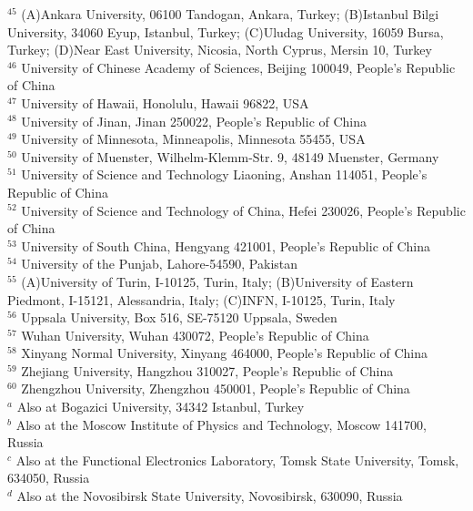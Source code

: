 \begin{small}
\begin{center}
{$^{45}$ (A)Ankara University, 06100 Tandogan, Ankara, Turkey; (B)Istanbul Bilgi University, 34060 Eyup, Istanbul, Turkey; (C)Uludag University, 16059 Bursa, Turkey; (D)Near East University, Nicosia, North Cyprus, Mersin 10, Turkey\\
$^{46}$ University of Chinese Academy of Sciences, Beijing 100049, People's Republic of China\\
$^{47}$ University of Hawaii, Honolulu, Hawaii 96822, USA\\
$^{48}$ University of Jinan, Jinan 250022, People's Republic of China\\
$^{49}$ University of Minnesota, Minneapolis, Minnesota 55455, USA\\
$^{50}$ University of Muenster, Wilhelm-Klemm-Str. 9, 48149 Muenster, Germany\\
$^{51}$ University of Science and Technology Liaoning, Anshan 114051, People's Republic of China\\
$^{52}$ University of Science and Technology of China, Hefei 230026, People's Republic of China\\
$^{53}$ University of South China, Hengyang 421001, People's Republic of China\\
$^{54}$ University of the Punjab, Lahore-54590, Pakistan\\
$^{55}$ (A)University of Turin, I-10125, Turin, Italy; (B)University of Eastern Piedmont, I-15121, Alessandria, Italy; (C)INFN, I-10125, Turin, Italy\\
$^{56}$ Uppsala University, Box 516, SE-75120 Uppsala, Sweden\\
$^{57}$ Wuhan University, Wuhan 430072, People's Republic of China\\
$^{58}$ Xinyang Normal University, Xinyang 464000, People's Republic of China\\
$^{59}$ Zhejiang University, Hangzhou 310027, People's Republic of China\\
$^{60}$ Zhengzhou University, Zhengzhou 450001, People's Republic of China\\
\vspace{0.2cm}
$^{a}$ Also at Bogazici University, 34342 Istanbul, Turkey\\
$^{b}$ Also at the Moscow Institute of Physics and Technology, Moscow 141700, Russia\\
$^{c}$ Also at the Functional Electronics Laboratory, Tomsk State University, Tomsk, 634050, Russia\\
$^{d}$ Also at the Novosibirsk State University, Novosibirsk, 630090, Russia\\
}
\end{center}
\end{small}
